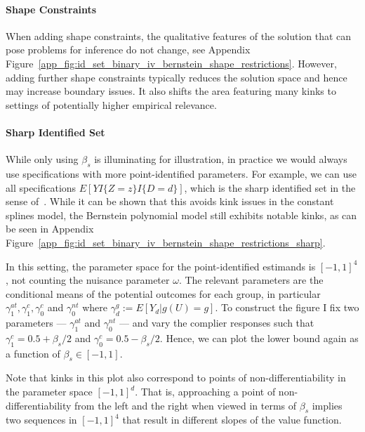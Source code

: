 \documentclass[12pt,a4paper,english]{article} %
\numberwithin{equation}{section}
\theoremstyle{definition}
\theoremstyle{remark}
\theoremstyle{plain}
\begin{document}
\paragraph{Shape Constraints}
When adding shape constraints, the qualitative features of the solution that can pose problems for inference do not change, see Appendix Figure~\ref{app_fig:id_set_binary_iv_bernstein_shape_restrictions}.
However, adding further shape constraints typically reduces the solution space and hence may increase boundary issues.
It also shifts the area featuring many kinks to settings of potentially higher empirical relevance.

\paragraph{Sharp Identified Set}
While only using $\beta_s$ is illuminating for illustration, in practice we would always use specifications with more point-identified parameters.
For example, we can use all specifications $E[YI\{Z=z\}I\{D=d\}]$, which is the sharp identified set in the sense of~\cite{mogstad2018using}.
While it can be shown that this avoids kink issues in the constant splines model, the Bernstein polynomial model still exhibits notable kinks, as can be seen in Appendix Figure~\ref{app_fig:id_set_binary_iv_bernstein_shape_restrictions_sharp}.

In this setting, the parameter space for the point-identified estimands is $[-1,1]^4$, not counting the nuisance parameter $\omega$.
The relevant parameters are the conditional means of the potential outcomes for each group, in particular $\gamma_1^{at}, \gamma_1^c, \gamma_0^c$ and $\gamma_0^{nt}$ where $\gamma_d^g := E[Y_d|g(U) = g]$.
To construct the figure I fix two parameters --- $\gamma_1^{at}$ and $\gamma_0^{nt}$ --- and vary the complier responses such that
$\gamma_1^c = 0.5 + \beta_s/2$ and $\gamma_0^c = 0.5 - \beta_s/2$. Hence, we can plot the lower bound again as a function of $\beta_s \in [-1,1]$.

Note that kinks in this plot also correspond to points of non-differentiability in the parameter space $[-1,1]^d$.
That is, approaching a point of non-differentiability from the left and the right when viewed in terms of $\beta_s$ implies two sequences in $[-1, 1]^4$ that result in different slopes of the value function.
\end{document}
